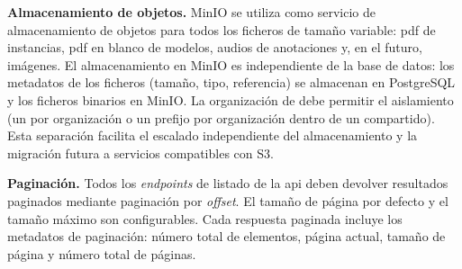 \item \textbf{Almacenamiento de objetos.} \label{rnf:object_storage}
MinIO se utiliza como servicio de almacenamiento de objetos para todos los ficheros de
tamaño variable: \acs{pdf} de instancias, \acs{pdf} en blanco de modelos, audios de
anotaciones y, en el futuro, imágenes. El almacenamiento en MinIO es independiente de la
base de datos: los metadatos de los ficheros (tamaño, tipo, referencia) se almacenan en
PostgreSQL y los ficheros binarios en MinIO. La organización de  debe
permitir el aislamiento  (un  por organización o un prefijo
por organización dentro de un  compartido). Esta separación facilita el
escalado independiente del almacenamiento y la migración futura a servicios compatibles con
S3.

\item \textbf{Paginación.} \label{rnf:pagination}
Todos los \textit{endpoints} de listado de la \acs{api} deben devolver resultados paginados
mediante paginación por \textit{offset}. El tamaño de página por defecto y el tamaño máximo
son configurables. Cada respuesta paginada incluye los metadatos de paginación: número
total de elementos, página actual, tamaño de página y número total de páginas.
